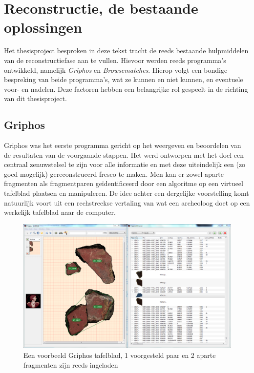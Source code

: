 \section{Reconstructie, de bestaande oplossingen}
Het thesisproject besproken in deze tekst tracht de reeds bestaande hulpmiddelen van de reconstructiefase aan te vullen. Hievoor werden reeds programma's ontwikkeld, namelijk \emph{Griphos} en \emph{Browsematches}. Hierop volgt een bondige bespreking van beide programma's, wat ze kunnen en niet kunnen, en eventuele voor- en nadelen. Deze factoren hebben een belangrijke rol gespeelt in de richting van dit thesisproject.

\subsection{Griphos}

Griphos was het eerste programma gericht op het weergeven en beoordelen van de resultaten van de voorgaande stappen. Het werd ontworpen met het doel een centraal zenuwstelsel te zijn voor alle informatie en met deze uiteindelijk een (zo goed mogelijk) gereconstrueerd fresco te maken. Men kan er zowel aparte fragmenten als fragmentparen ge\"identificeerd door een algoritme op een virtueel tafelblad plaatsen en manipuleren. De idee achter een dergelijke voorstelling komt natuurlijk voort uit een rechstreekse vertaling van wat een archeoloog doet op een werkelijk tafelblad naar de computer.\\

\begin{figure}[ht]
	\begin{center}
		\includegraphics[width=.8\columnwidth]{images/griphos-01-cut.png}
		\caption{Een voorbeeld Griphos tafelblad, 1 voorgesteld paar en 2 aparte fragmenten zijn reeds ingeladen}
	\end{center}
\end{figure}

